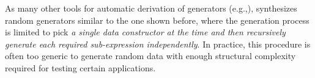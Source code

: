 As many other tools for automatic derivation of generators
(e.g.,\cite{GriecoCB16,RuncimanNL08,mitchell2007,DuregardJW12}), {\dragen}
synthesizes random generators similar to the one shown before, where the
generation process is limited to pick \emph{a single data constructor at the
  time and then recursively generate each required sub-expression
  independently}.
%
%
%
In practice, this procedure is often too generic to generate random data with
enough structural complexity required for testing certain applications.


